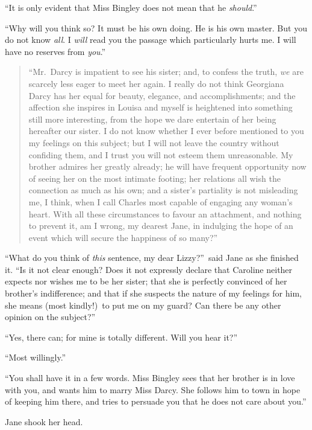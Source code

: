 \documentclass[12pt,english]{book}
\begin{document}
{}``It is only evident that Miss Bingley does not mean that he \textit{should}.''

{}``Why will you think so? It must be his own doing. He is his own
master. But you do not know \textit{all}. I \textit{will} read you
the passage which particularly hurts me. I will have no reserves from
\textit{you}.''

\begin{quotation}
{}``Mr.\ Darcy is impatient to see his sister; and, to confess the
truth, \textit{we} are scarcely less eager to meet her again. I really
do not think Georgiana Darcy has her equal for beauty, elegance, and
accomplishments; and the affection she inspires in Louisa and myself
is heightened into something still more interesting, from the hope
we dare entertain of her being hereafter our sister. I do not know
whether I ever before mentioned to you my feelings on this subject;
but I will not leave the country without confiding them, and I trust
you will not esteem them unreasonable. My brother admires her greatly
already; he will have frequent opportunity now of seeing her on the
most intimate footing; her relations all wish the connection as much
as his own; and a sister's partiality is not misleading me, I think,
when I call Charles most capable of engaging any woman's heart. With
all these circumstances to favour an attachment, and nothing to prevent
it, am I wrong, my dearest Jane, in indulging the hope of an event
which will secure the happiness of so many?''\ 
\end{quotation}
{}``What do you think of \textit{this} sentence, my dear Lizzy?''\ 
said Jane as she finished it. {}``Is it not clear enough? Does it
not expressly declare that Caroline neither expects nor wishes me
to be her sister; that she is perfectly convinced of her brother's
indifference; and that if she suspects the nature of my feelings for
him, she means (most kindly!)\ to put me on my guard? Can there be
any other opinion on the subject?''\ 

{}``Yes, there can; for mine is totally different. Will you hear
it?''\ 

{}``Most willingly.''

{}``You shall have it in a few words. Miss Bingley sees that her
brother is in love with you, and wants him to marry Miss Darcy. She
follows him to town in hope of keeping him there, and tries to persuade
you that he does not care about you.''

Jane shook her head.
\end{document}
